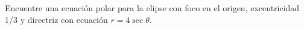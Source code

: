 \item Encuentre una ecuación polar para la elipse con foco en el origen, excentricidad 1/3 y directriz con ecuación $r = 4\sec\theta$.
